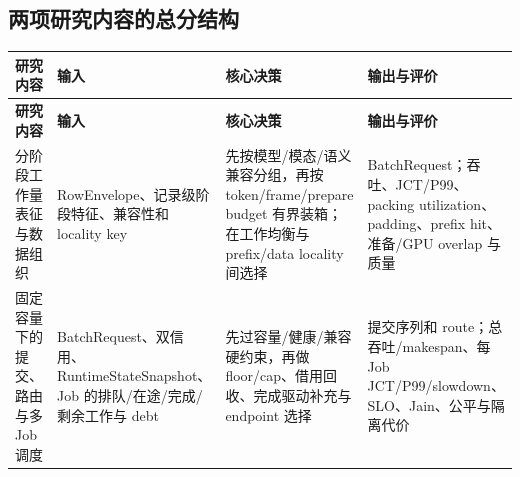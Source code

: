 \documentclass[10pt,a4paper]{ctexart}
\begin{document}
\subsection{两项研究内容的总分结构}
\begin{longtable}{>{\raggedright\arraybackslash}p{2.1cm}>{\raggedright\arraybackslash}p{3.15cm}>{\raggedright\arraybackslash}p{4.8cm}>{\raggedright\arraybackslash}p{5.0cm}}
\toprule
\textbf{研究内容} & \textbf{输入} & \textbf{核心决策} & \textbf{输出与评价} \\
\midrule
\endfirsthead
\toprule
\textbf{研究内容} & \textbf{输入} & \textbf{核心决策} & \textbf{输出与评价} \\
\midrule
\endhead
分阶段工作量表征与数据组织 & RowEnvelope、记录级阶段特征、兼容性和 locality key & 先按模型/模态/语义兼容分组，再按 token/frame/prepare budget 有界装箱；在工作均衡与 prefix/data locality 间选择 & BatchRequest；吞吐、JCT/P99、packing utilization、padding、prefix hit、准备/GPU overlap 与质量 \\
\addlinespace
固定容量下的提交、路由与多 Job 调度 & BatchRequest、双信用、RuntimeStateSnapshot、Job 的排队/在途/完成/剩余工作与 debt & 先过容量/健康/兼容硬约束，再做 floor/cap、借用回收、完成驱动补充与 endpoint 选择 & 提交序列和 route；总吞吐/makespan、每 Job JCT/P99/slowdown、SLO、Jain、公平与隔离代价 \\
\bottomrule
\end{longtable}
\end{document}
